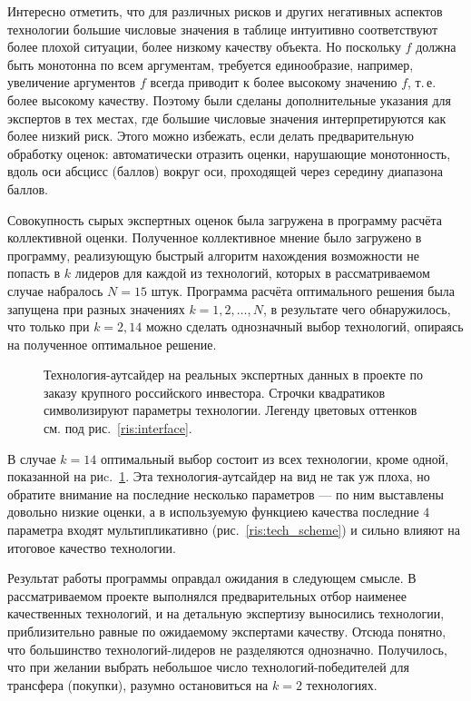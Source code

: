 Интересно отметить, что для различных рисков и других негативных аспектов технологии большие числовые значения в таблице интуитивно соответствуют более плохой ситуации, более низкому качеству объекта. Но поскольку $f$ должна быть монотонна по всем аргументам, требуется единообразие, например, увеличение аргументов $f$  всегда приводит к более высокому значению $f$, т.\,е. более высокому качеству. Поэтому были сделаны дополнительные указания для экспертов в тех местах, где большие числовые значения интерпретируются как более низкий риск. Этого можно избежать, если делать предварительную обработку оценок: автоматически отразить оценки, нарушающие монотонность, вдоль оси абсцисс (баллов) вокруг оси, проходящей через середину диапазона баллов.

Совокупность сырых экспертных оценок была загружена в программу расчёта коллективной оценки. Полученное коллективное мнение было загружено в программу, реализующую быстрый алгоритм нахождения возможности не попасть в $k$ лидеров для каждой из технологий, которых в рассматриваемом случае набралось $N = 15$ штук. Программа расчёта оптимального решения была запущена при разных значениях $k = 1, 2, \ldots, N$, в результате чего обнаружилось, что только при $k=2, 14$ можно сделать однозначный выбор технологий, опираясь на полученное оптимальное решение.  

\begin{figure}[h]
\caption{\small Технология-аутсайдер на реальных экспертных данных в проекте по заказу крупного российского инвестора. Строчки квадратиков символизируют параметры технологии. Легенду цветовых оттенков см. под рис.~\ref{ris:interface}.}
\label{ris:tech_13}
\end{figure}

В случае $k = 14$ оптимальный выбор состоит из всех технологии, кроме одной, показанной на риc.~\ref{ris:tech_13}. Эта технология-аутсайдер на вид не так уж плоха, но обратите внимание на последние несколько параметров --- по ним выставлены довольно низкие оценки, а в используемую функциею качества последние $4$ параметра входят мультипликативно (рис.~\ref{ris:tech_scheme}) и сильно влияют на итоговое качество технологии.

Результат работы программы оправдал ожидания в следующем смысле. В рассматриваемом проекте выполнялся предварительных отбор наименее качественных технологий, и на детальную экспертизу выносились технологии, приблизительно равные по ожидаемому экспертами качеству. Отсюда понятно, что большинство технологий-лидеров не разделяются однозначно. Получилось, что при желании выбрать небольшое число технологий-победителей для трансфера (покупки), разумно остановиться на $k=2$ технологиях. 

